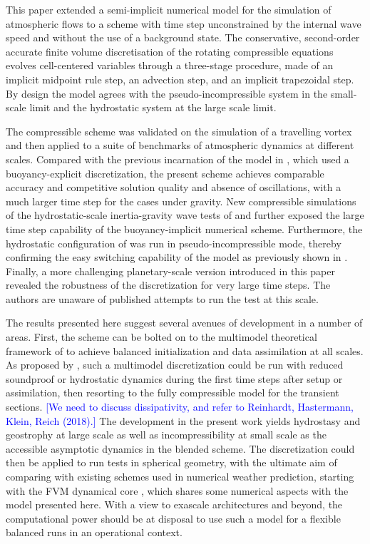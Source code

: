 \documentclass{ametsoc}
\theoremstyle{definition}
\newcommand{\klein}[1]{\textcolor{blue}{#1}}
\begin{document}
This paper extended a semi-implicit numerical model for the simulation of atmospheric flows to a scheme with time step unconstrained by the internal wave speed and without the use of a background state. The conservative, second-order accurate finite volume discretisation of the rotating compressible equations evolves cell-centered variables through a three-stage procedure, made of an implicit midpoint rule step, an advection step, and an implicit trapezoidal step. By design the model agrees with the pseudo-incompressible system in the small-scale limit and the hydrostatic system at the large scale limit.

The compressible scheme was validated on the simulation of a travelling vortex and then applied to a suite of benchmarks of atmospheric dynamics at different scales. Compared with the previous incarnation of the model in \cite{Benacchio2014, BenacchioEtAl2014}, which used a buoyancy-explicit discretization, the present scheme achieves comparable accuracy and competitive solution quality and absence of oscillations, with a much larger time step for the cases under gravity. New compressible simulations of the hydrostatic-scale inertia-gravity wave tests of \cite{BaldaufBrdar2013} and \cite{SkamarockKlemp1994} further exposed the large time step capability of the buoyancy-implicit numerical scheme. Furthermore, the hydrostatic configuration of \cite{SkamarockKlemp1994} was run in pseudo-incompressible mode, thereby confirming the easy switching capability of the model as previously shown in \cite{BenacchioEtAl2014, KleinBenacchio2016}. Finally, a more challenging planetary-scale version introduced in this paper revealed the robustness of the discretization for very large time steps. The authors are unaware of published attempts to run the test at this scale.

The results presented here suggest several avenues of development in a number of areas. First, the scheme can be bolted on to the multimodel theoretical framework of \cite{KleinBenacchio2016} to achieve balanced initialization and data assimilation at all scales. As proposed by \cite{BenacchioEtAl2014}, such a multimodel discretization could be run with reduced soundproof or hydrostatic dynamics during the first time steps after setup or assimilation, then resorting to the fully compressible model for the transient sections. \klein{[We need to discuss dissipativity, and refer to Reinhardt, Hastermann, Klein, Reich (2018).]} The development in the present work yields hydrostasy and geostrophy at large scale as well as incompressibility at small scale as the accessible asymptotic dynamics in the blended scheme. The discretization could then be applied to run tests in spherical geometry, with the ultimate aim of comparing with existing schemes used in numerical weather prediction, starting with the FVM dynamical core \citep{KuehnleinEtAl2018}, which shares some numerical aspects with the model presented here. With a view to exascale architectures and beyond, the computational power should be at disposal to use such a model for a flexible balanced runs in an operational context.
\end{document}
